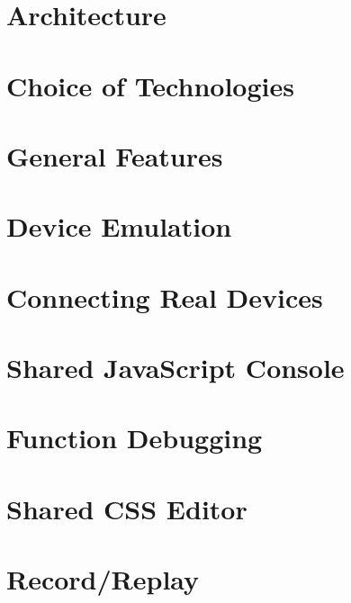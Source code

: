 \section{Architecture}

\section{Choice of Technologies}

\section{General Features}

\section{Device Emulation}

\section{Connecting Real Devices}

\section{Shared JavaScript Console}

\section{Function Debugging}

\section{Shared CSS Editor}

\section{Record/Replay}